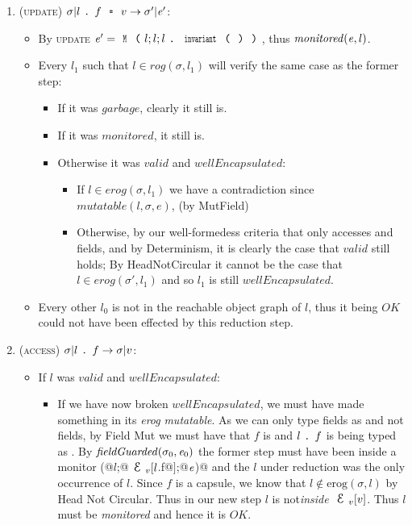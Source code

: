 \begin{enumerate}
\item (\textsc{update}) $\sigma|l\singleDot f\equals v\rightarrow \sigma'|\e'$:
	\begin{itemize}
	  \item By \textsc{update} $\e'=\Kw{M}\oR l;l;l\singleDot\Kw{invariant}\oR\cR\cR$, thus $\mathit{monitored}({\mathit{e}},l)$.
	  \item Every $l_1$ such that $l\in \mathit{rog}(\sigma,l_1)$ will verify the same case as the former step:
	  \begin{itemize}
	  	\item If it was $\mathit{garbage}$, clearly it still is.
	  	\item If it was $\mathit{monitored}$, it still is.
	    \item Otherwise it was $\mathit{valid}$ and $\mathit{wellEncapsulated}$:
			\begin{itemize}
				\item If $l\in \mathit{erog}(\sigma,l_1)$ we have a contradiction since $mutatable(l, \sigma, e)$, (by MutField)
		    	\item Otherwise, by our well-formedess criteria that \Q@invariant@ only accesses \Q@imm@ and \Q@capsule@ fields, and by Determinism, it is clearly the case that $\mathit{valid}$ still holds;
				By HeadNotCircular it cannot be the case that $l\in \mathit{erog}(\sigma',l_1)$ and so $l_1$ is still $\mathit{wellEncapsulated}$.
		  	\end{itemize}
	  \end{itemize}
	  \item Every other $l_0$ is not in the reachable object graph of $l$,
	  thus it being $\mathit{OK}$ could not have been effected by this reduction step.
	\end{itemize}

\item (\textsc{access}) $\sigma|l{ \mbox{ {\texttt{.}} } } f \rightarrow \sigma|v$:
	\begin{itemize}
		\item If $l$ was $valid$ and $wellEncapsulated$:
		\begin{itemize}
			\item If we have now broken $wellEncapsulated$, we must have made something in its \emph{erog} \emph{mutatable}. As we can only type \Q@capsule@ fields as \Q@mut@ and not \Q@imm@ fields, by Field Mut we must have that $f$ is \Q@capsule@ and $l{ \mbox{ {\texttt{.}} } } f$ is being typed as \Q@mut@. By $\mathit{fieldGuarded}(\sigma_0,{\mathit{e}}_0)$ the former step must have been inside a monitor \Q@M(@$l$\Q@;@$\ctx_v[l$\Q@.f@$]$\Q@;@${\mathit{e}}$\Q@)@
		    and the $l$ under reduction was the only occurrence of $l$.
		    Since $f$ is a capsule, we know that $l\notin \text{erog}(\sigma,l)$
		    by Head Not Circular. Thus in our new step $l$ is not\emph{inside} $\ctx_v[v]$. Thus $l$ must be \emph{monitored} and hence it is $OK$.


\end{itemize}
\end{itemize}
\end{enumerate}
